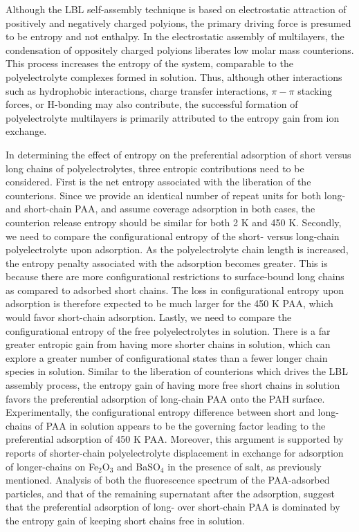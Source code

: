 \documentclass[journal=mamobx,manuscript=article]{achemso}
\begin{document}
Although the LBL self-assembly technique is based on electrostatic attraction of positively and negatively charged polyions, the primary driving force is presumed to be entropy and not enthalpy.  In the electrostatic assembly of multilayers, the condensation of oppositely charged polyions liberates low molar mass counterions.  This process increases the entropy of the system, comparable to the polyelectrolyte complexes formed in solution.\cite{Kabanov1994,Philipp1989}  Thus, although other interactions such as hydrophobic interactions, charge transfer interactions, $\pi{-}\pi$ stacking forces, or H-bonding may also contribute, the successful formation of polyelectrolyte multilayers is primarily attributed to the entropy gain from ion 
exchange.\cite{Kotov1999,Bertrand2000}  

In determining the effect of entropy on the preferential adsorption of short versus long chains of polyelectrolytes, three entropic contributions need to be considered.  First is the net entropy associated with the liberation of the counterions.  Since we provide an identical number of repeat units for both long- and short-chain PAA, and assume coverage adsorption in both cases, the counterion release entropy should be similar for both 2 K and 450 K.  Secondly, we need to compare the configurational entropy of the short- versus long-chain polyelectrolyte upon adsorption.  As the polyelectrolyte chain length is increased, the entropy penalty associated with the adsorption becomes greater.  This is because there are more configurational restrictions to surface-bound long chains as compared to adsorbed short chains.  The loss in configurational entropy upon adsorption is therefore expected to be much larger for the 450 K PAA, which would favor short-chain adsorption.  Lastly, we need to compare the configurational entropy of the free polyelectrolytes in solution.  There is a far greater entropic gain from having more shorter chains in solution, which can explore a greater number of configurational states than a fewer longer chain species in solution.  Similar to the liberation of counterions which drives the LBL assembly process, the entropy gain of having more free short chains in solution favors the preferential adsorption of long-chain PAA onto the PAH surface.  Experimentally, the configurational entropy difference between short and long-chains of PAA in solution appears to be the governing factor leading to the preferential adsorption of 450 K PAA.  Moreover, this argument is supported by reports of shorter-chain polyelectrolyte displacement in exchange for adsorption of longer-chains on Fe$_2$O$_3$ and BaSO$_4$ in the presence of salt, as previously mentioned.\cite{DeLaat1995}  Analysis of both the fluorescence spectrum of the PAA-adsorbed particles, and that of the remaining supernatant after the adsorption, suggest that the preferential adsorption of long- over short-chain PAA is dominated by the entropy gain of keeping short chains free in solution.
\end{document}
